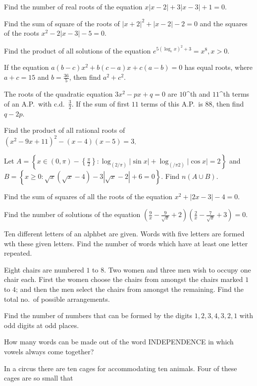 \item Find the number of real roots of the equation $x|x - 2| + 3|x - 3| + 1 = 0$.
\item Find the sum of square of the roots of $|x + 2|^2 + |x - 2| - 2 = 0$ and the squares of the roots $x^2
  - 2|x - 3| - 5 = 0$.
\item Find the product of all solutions of the equation $e^{5\left(\log_ex\right)^2 + 3} = x^8, x > 0$.
\item If the equation $a(b - c)x^2 + b(c - a)x + c(a - b) = 0$ has equal roots, where $a + c = 15$ and $b
  = \frac{36}{5}$, then find $a^2 + c^2$.
\item The roots of the quadratic equation $3x^2 - px + q = 0$ are $10$^{th} and $11$^{th} terms of an A.P.\
  with c.d.\ $\frac{3}{2}$. If the sum of first $11$ terms of this A.P.\ is $88$, then find $q - 2p$.
\item Find the product of all rational roots of $\left(x^2 - 9x + 11\right)^2 - (x - 4)(x - 5) = 3$.
\item Let $A = \left\{x\in(0, \pi) - \left\{\frac{\pi}{2}\right\}: \log_{(2/\pi)}|\sin x|
  + \log_{(/\pi2)}|\cos x| = 2\right\}$ and $B = \left\{x\geq 0: \sqrt{x}\left(\sqrt{x} - 4\right) -
  3\left|\sqrt{x} - 2\right| + 6 = 0\right\}$. Find $n(A\cup B)$.
\item Find the sum of squares of all the roots of the equation $x^2 + |2x - 3| - 4 = 0$.
\item Find the number of solutions of the equation $\left(\frac{9}{x} - \frac{9}{\sqrt{x}} +
  2\right)\left(\frac{2}{x} - \frac{7}{\sqrt{x}} + 3\right) = 0$.
\item Ten different letters of an alphbet are given. Words with five letters are formed wth these given
  letters. Find the number of words which have at least one letter repeated.
\item Eight chairs are numbered $1$ to $8$. Two women and three men wish to occupy one chair each. First the
  women choose the chairs from amongst the chairs marked $1$ to $4$; and then the men select the chairs from
  amongst the remaining. Find the total no.\ of possible arrangements.
\item Find the number of numbers that can be formed by the digits $1, 2, 3, 4, 3, 2, 1$ with odd digits at
  odd places.
\item How many words can be made out of the word INDEPENDENCE in which vowels always come together?
\item In a circus there are ten cages for accommodating ten animals. Four of these cages are so small that
